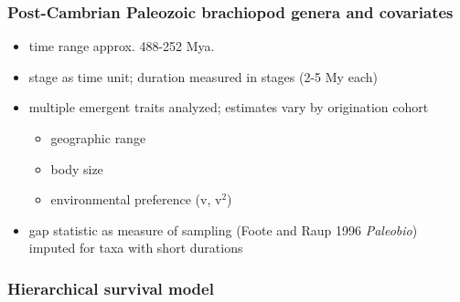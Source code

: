 \documentclass{beamer}
\begin{document}
\begin{frame}
  \frametitle{Post-Cambrian Paleozoic brachiopod genera and covariates}
  \begin{itemize}
    \item time range approx. 488-252 Mya.
    \item stage as time unit; duration measured in stages (2-5 My each)
    \item multiple emergent traits analyzed; estimates vary by origination cohort
      \begin{itemize}
        \item geographic range
        \item body size
        \item environmental preference (v, v\(^2\))
      \end{itemize}
    \item gap statistic as measure of sampling {\footnotesize{(Foote and Raup 1996 \textit{Paleobio})}} \\imputed for taxa with short durations
  \end{itemize}
\end{frame}


\begin{frame}
  \frametitle{Hierarchical survival model}
  \begin{center}
  \end{center}
\end{frame}
\end{document}
